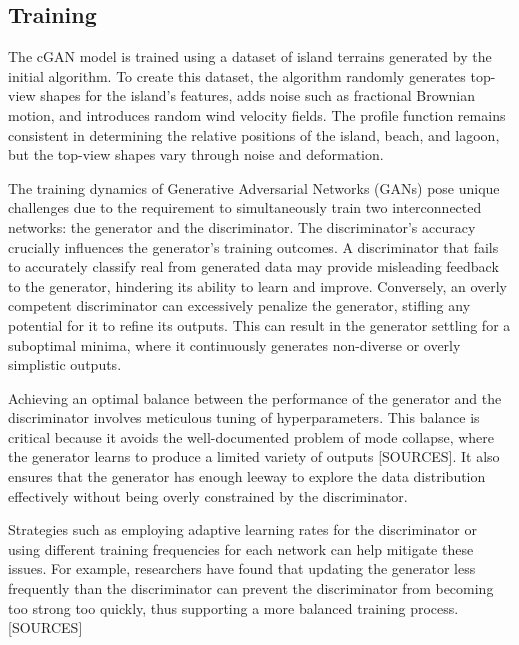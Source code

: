 \subsection{Training}

The cGAN model is trained using a dataset of island terrains generated by the initial algorithm. To create this dataset, the algorithm randomly generates top-view shapes for the island's features, adds noise such as fractional Brownian motion, and introduces random wind velocity fields. The profile function remains consistent in determining the relative positions of the island, beach, and lagoon, but the top-view shapes vary through noise and deformation.

The training dynamics of Generative Adversarial Networks (GANs) pose unique challenges due to the requirement to simultaneously train two interconnected networks: the generator and the discriminator. The discriminator's accuracy crucially influences the generator's training outcomes. A discriminator that fails to accurately classify real from generated data may provide misleading feedback to the generator, hindering its ability to learn and improve. Conversely, an overly competent discriminator can excessively penalize the generator, stifling any potential for it to refine its outputs. This can result in the generator settling for a suboptimal minima, where it continuously generates non-diverse or overly simplistic outputs.

Achieving an optimal balance between the performance of the generator and the discriminator involves meticulous tuning of hyperparameters. This balance is critical because it avoids the well-documented problem of mode collapse, where the generator learns to produce a limited variety of outputs [SOURCES]. It also ensures that the generator has enough leeway to explore the data distribution effectively without being overly constrained by the discriminator.

Strategies such as employing adaptive learning rates for the discriminator or using different training frequencies for each network can help mitigate these issues. For example, researchers have found that updating the generator less frequently than the discriminator can prevent the discriminator from becoming too strong too quickly, thus supporting a more balanced training process. [SOURCES]


